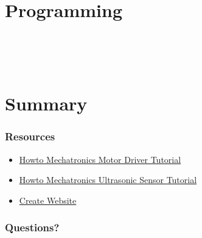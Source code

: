 \documentclass[compress]{beamer}
\begin{document}
\section{Programming}

\begin{frame}[fragile]
    \inputminted[linenos, breaklines, firstline=1, lastline=10]{arduino}{code/workshop.ino}
\end{frame}

\begin{frame}[fragile]
    \inputminted[linenos, breaklines, firstline=11, lastline=24]{arduino}{code/workshop.ino}
\end{frame}

\begin{frame}[fragile]
    \inputminted[linenos, breaklines, firstline=25, lastline=38]{arduino}{code/workshop.ino}
\end{frame}

\begin{frame}[fragile]
    \inputminted[linenos, breaklines, firstline=39, lastline=45]{arduino}{code/workshop.ino}
\end{frame}

\begin{frame}[fragile]
    \inputminted[linenos, breaklines, firstline=46, lastline=61]{arduino}{code/workshop.ino}
\end{frame}

\section{Summary}

\begin{frame}[fragile]
    \frametitle{Resources}
    \begin{itemize}
        \item \href{https://howtomechatronics.com/tutorials/arduino/arduino-dc-motor-control-tutorial-l298n-pwm-h-bridge/}{Howto Mechatronics Motor Driver Tutorial}
        \item \href{https://howtomechatronics.com/tutorials/arduino/ultrasonic-sensor-hc-sr04/}{Howto Mechatronics Ultrasonic Sensor Tutorial}
        \item \href{https://www.createunsw.com.au/}{Create Website}
    \end{itemize}
\end{frame}

\begin{frame}[fragile]
    \frametitle{Questions?}
\end{frame}
\end{document}
